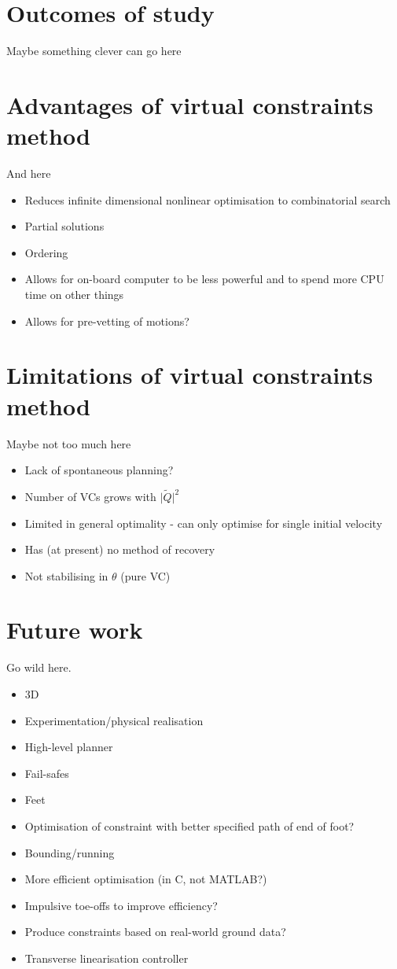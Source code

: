 \section{Outcomes of study}
Maybe something clever can go here

\section{Advantages of virtual constraints method}
And here
\begin{itemize}
	\item Reduces infinite dimensional nonlinear optimisation to combinatorial search
	\item Partial solutions
	\item Ordering
	\item Allows for on-board computer to be less powerful and to spend more CPU time on other things
	\item Allows for pre-vetting of motions?
\end{itemize}

\section{Limitations of virtual constraints method}
Maybe not too much here
\begin{itemize}
	\item Lack of spontaneous planning?
	\item Number of VCs grows with $\lvert\tilde{Q}\rvert^2$
	\item Limited in general optimality - can only optimise for single initial velocity
	\item Has (at present) no method of recovery
	\item Not stabilising in $\theta$ (pure VC)
\end{itemize}

\section{Future work}
Go wild here.

\begin{itemize}
	\item 3D
	\item Experimentation/physical realisation
	\item High-level planner
	\item Fail-safes
	\item Feet
	\item Optimisation of constraint with better specified path of end of foot?
	\item Bounding/running
	\item More efficient optimisation (in C, not MATLAB?)
	\item Impulsive toe-offs to improve efficiency?
	\item Produce constraints based on real-world ground data?
	\item Transverse linearisation controller
\end{itemize}